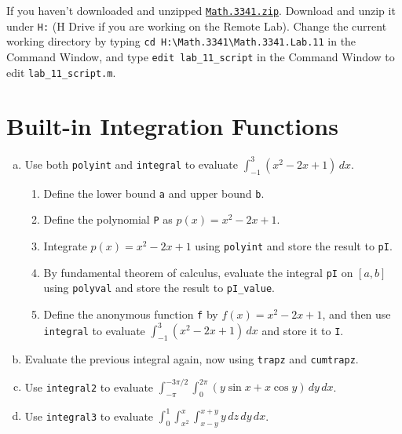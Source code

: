 If you haven't downloaded and unzipped \href{https://libaoj.in/courses/2021f/MATH3341/zip/Math.3341.zip}{\texttt{Math.3341.zip}}. Download and unzip it under \verb|H:| (H Drive if you are working on the Remote Lab). Change the current working directory by typing \verb|cd H:\Math.3341\Math.3341.Lab.11| in the Command Window, and type \verb|edit lab_11_script| in the Command Window to edit \verb|lab_11_script.m|.

\section{Built-in Integration Functions}
\begin{enumerate}[(a)]
\item Use both \verb|polyint| and \verb|integral| to evaluate $\displaystyle \int_{-1}^{3} (x^2 - 2x + 1) \, dx$.
    \begin{enumerate}[(1)]
        \item Define the lower bound \verb|a| and upper bound \verb|b|.
        \item Define the polynomial \verb|P| as $p(x) = x^{2} - 2x + 1$.
        \item Integrate $p(x) = x^{2} - 2x + 1$ using \verb|polyint| and store the result to \verb|pI|.
        \item By fundamental theorem of calculus, evaluate the integral \verb|pI| on $[a, b]$ using \verb|polyval| and store the result to \verb|pI_value|.
        \item Define the anonymous function \verb|f| by $f(x) = x^2 - 2x + 1$, and then use \verb|integral| to evaluate $\displaystyle \int_{-1}^{3} (x^2 - 2x + 1) \, dx$ and store it to \verb|I|.
    \end{enumerate}
\item Evaluate the previous integral again, now using \verb|trapz| and \verb|cumtrapz|.
\item Use \verb|integral2| to evaluate $\displaystyle \int_{-\pi}^{-3\pi / 2} \int_{0}^{2 \pi} (y \sin{x} + x \cos{y}) \, dy \, dx$.
\item Use \verb|integral3| to evaluate $\displaystyle \int_{0}^{1} \int_{x^2}^{x} \int_{x-y}^{x+y} y \, dz \, dy \, dx$.
\end{enumerate}
